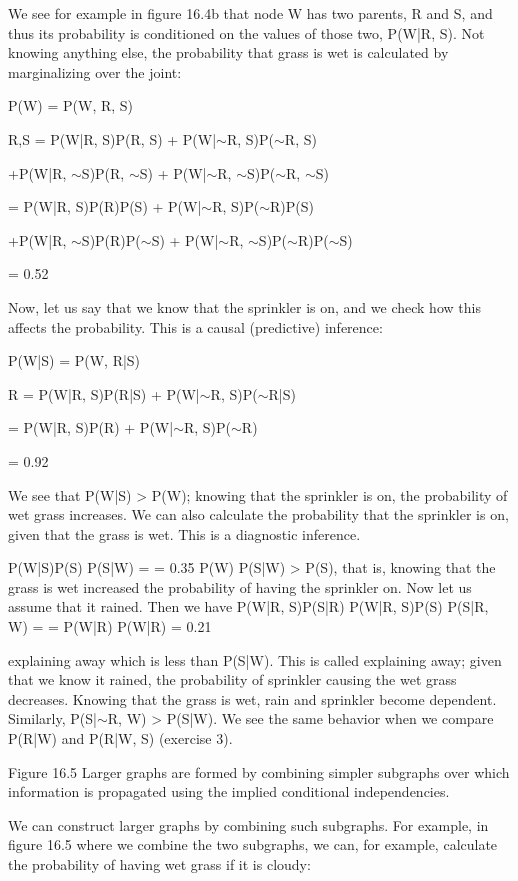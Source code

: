 We see for example in figure 16.4b that node W has two parents, R and S, and thus its probability is conditioned on the values of those two, P(W|R, S). Not knowing anything else, the probability that grass is wet is calculated by marginalizing over the joint:

P(W) = P(W, R, S)

R,S = P(W|R, S)P(R, S) + P(W|$\sim$R, S)P($\sim$R, S)

+P(W|R, $\sim$S)P(R, $\sim$S) + P(W|$\sim$R, $\sim$S)P($\sim$R, $\sim$S)

= P(W|R, S)P(R)P(S) + P(W|$\sim$R, S)P($\sim$R)P(S)

+P(W|R, $\sim$S)P(R)P($\sim$S) + P(W|$\sim$R, $\sim$S)P($\sim$R)P($\sim$S)

= 0.52

Now, let us say that we know that the sprinkler is on, and we check how this affects the probability. This is a causal (predictive) inference:

P(W|S) = P(W, R|S)

R = P(W|R, S)P(R|S) + P(W|$\sim$R, S)P($\sim$R|S)

= P(W|R, S)P(R) + P(W|$\sim$R, S)P($\sim$R)

= 0.92

We see that P(W|S) > P(W); knowing that the sprinkler is on, the probability of wet grass increases. We can also calculate the probability that the sprinkler is on, given that the grass is wet. This is a diagnostic inference.

P(W|S)P(S) P(S|W) = = 0.35 P(W) P(S|W) > P(S), that is, knowing that the grass is wet increased the probability of having the sprinkler on. Now let us assume that it rained. Then we have P(W|R, S)P(S|R) P(W|R, S)P(S) P(S|R, W) = = P(W|R) P(W|R) = 0.21

explaining away which is less than P(S|W). This is called explaining away; given that we know it rained, the probability of sprinkler causing the wet grass decreases. Knowing that the grass is wet, rain and sprinkler become dependent. Similarly, P(S|$\sim$R, W) > P(S|W). We see the same behavior when we compare P(R|W) and P(R|W, S) (exercise 3).

Figure 16.5 Larger graphs are formed by combining simpler subgraphs over which information is propagated using the implied conditional independencies.

We can construct larger graphs by combining such subgraphs. For example, in figure 16.5 where we combine the two subgraphs, we can, for example, calculate the probability of having wet grass if it is cloudy:

